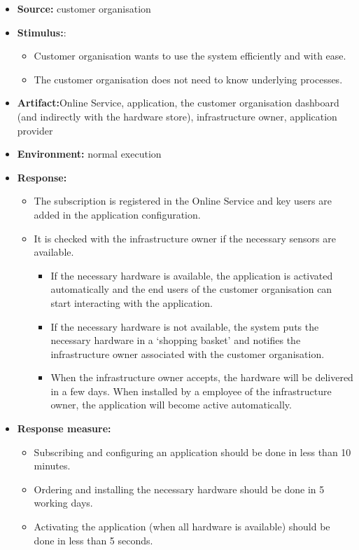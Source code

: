 \documentclass[english]{sareport}
\begin{document}
\begin{itemize}
    \item \textbf{Source:} customer organisation
    \item \textbf{Stimulus:}: 
    \begin{itemize}
    \item Customer organisation wants to use the system efficiently and with ease.
    \item The customer organisation does not need to know underlying processes.
    \end{itemize}
    \item \textbf{Artifact:}Online Service, application, the customer organisation dashboard (and indirectly with the hardware store), infrastructure owner, application provider
    \item \textbf{Environment:} normal execution
    \item \textbf{Response:}
        \begin{itemize}
            \item The subscription is registered in the Online Service and key users are added in the application configuration.
            \item It is checked with the infrastructure owner if the necessary sensors are available.
            \begin{itemize} 
            \item If the necessary hardware is available, the application is activated automatically and the end users of the customer organisation can start interacting with the application.
            \item If the necessary hardware is not available, the system puts the necessary hardware in a `shopping basket' and notifies the infrastructure owner associated with the customer organisation.
            \item When the infrastructure owner accepts, the hardware will be delivered in a few days. When installed by a employee of the infrastructure owner, the application will become active automatically.
            \end{itemize}
        \end{itemize}

    \item \textbf{Response measure:}
        \begin{itemize}
            \item Subscribing and configuring an application should be done in less than 10 minutes.
            \item Ordering and installing the necessary hardware should be done in 5 working days.
            \item Activating the application (when all hardware is available) should be done in less than 5 seconds.
        \end{itemize}
\end{itemize}
\end{document}

